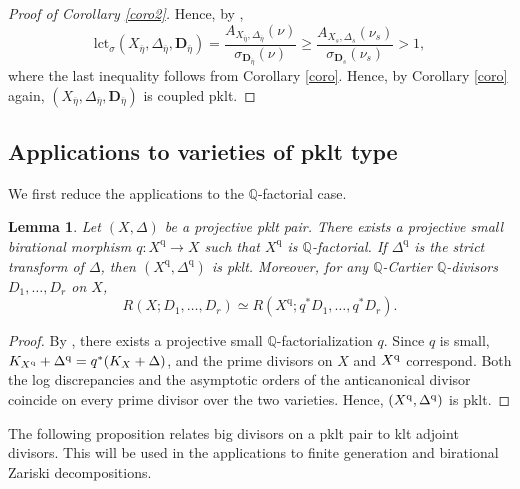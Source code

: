 \documentclass[a4paper,12pt]{amsart}
\newtheorem{lemma}[theorem]{Lemma}
\theoremstyle{plain}
\theoremstyle{definition}
\numberwithin{equation}{section}
\newcommand{\Q}{\mathbb{Q}}
\begin{document}
\begin{proof}[Proof of Corollary \ref{coro2}]
Hence, by \cite[Proposition 2.5]{Kim25},
$$ \mathrm{lct}_{\sigma}(X_{\overline{\eta}},\Delta_{\overline{\eta}},\mathbf{D}_{\overline{\eta}})=\frac{A_{X_{\overline{\eta}},\Delta_{\overline{\eta}}}(\nu)}{\sigma_{\mathbf{D}_{\overline{\eta}}}(\nu)}\ge \frac{A_{X_s,\Delta_s}(\nu_s)}{\sigma_{\mathbf{D}_s}(\nu_s)}>1,$$
where the last inequality follows from Corollary \ref{coro}. Hence, by Corollary \ref{coro} again, $(X_{\overline{\eta}},\Delta_{\overline{\eta}},\mathbf{D}_{\overline{\eta}})$ is coupled pklt.
\end{proof}

\subsection{Applications to varieties of pklt type}\label{subsect-appl}
We first reduce the applications to the $\Q$-factorial case.
\begin{lemma}\label{lem:qfactorial-reduction}
Let $(X,\Delta)$ be a projective pklt pair. There exists a projective small birational morphism \(q\colon X^{\mathrm q}\to X\) such that $X^{\mathrm q}$ is $\Q$-factorial. If $\Delta^{\mathrm q}$ is the strict transform of $\Delta$, then $(X^{\mathrm q},\Delta^{\mathrm q})$ is pklt. Moreover, for any $\Q$-Cartier $\Q$-divisors $D_1,\dots,D_r$ on $X$,
\[
R(X;D_1,\dots,D_r)
\simeq
R(X^{\mathrm q};q^*D_1,\dots,q^*D_r).
\]
\end{lemma}
\begin{proof}
    By \cite[Corollary 1.4.3]{BCHM}, there exists a projective small $\Q$-factorialization $q$. Since $q$ is small, $K_{X^{\rm q}}+\Delta^{\rm q}=q^{\ast}(K_X+\Delta)$, and the prime divisors on $X$ and $X^{\rm q}$ correspond. Both the log discrepancies and the asymptotic orders of the anticanonical divisor coincide on every prime divisor over the two varieties. Hence, $(X^{\rm q},\Delta^{\rm q})$ is pklt.
\end{proof}

The following proposition relates big divisors on a pklt pair to klt adjoint divisors. This will be used in the applications to finite generation and birational Zariski decompositions.
\end{document}
